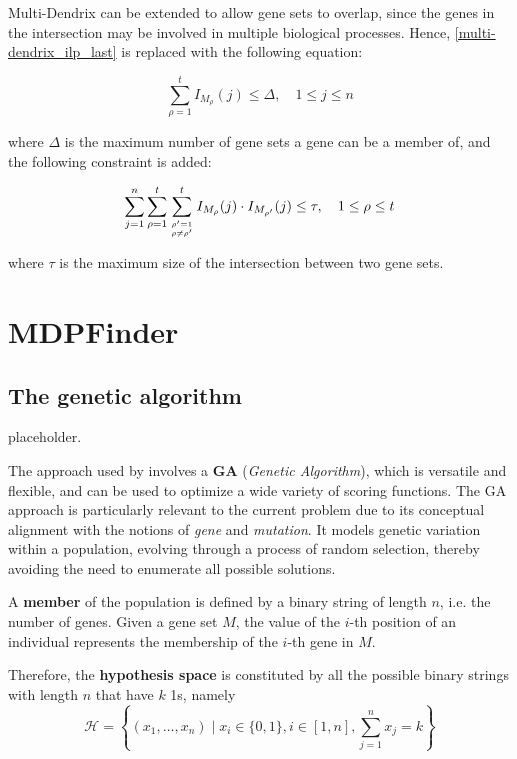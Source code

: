Multi-Dendrix can be extended to allow gene sets to overlap, since the genes in the intersection may be involved in multiple biological processes. Hence, \cref{multi-dendrix_ilp_last} is replaced with the following equation:

\begin{equation}
    \sum_{\rho = 1}^t {I_{M_\rho}(j) \le \Delta}, \quad 1 \le j \le n
\end{equation}

where $\Delta$ is the maximum number of gene sets a gene can be a member of, and the following constraint is added:

\begin{equation}
    \sum_{j = 1}^n {\sum_{\rho = 1}^t \sum_{\rho' = 1 \atop \rho \neq \rho'}^t {{I_{M_\rho} (j) \cdot I_{M_{\rho'}} (j)}}} \le \tau, \quad 1 \le \rho \le t
\end{equation}

where $\tau$ is the maximum size of the intersection between two gene sets.

\section{MDPFinder}

\subsection{The genetic algorithm}

placeholder. 

The approach used by \textcite{mdpfinder} involves a \textbf{GA} (\textit{Genetic Algorithm}), which is versatile and flexible, and can be used to optimize a wide variety of scoring functions. The GA approach is particularly relevant to the current problem due to its conceptual alignment with the notions of \textit{gene} and \textit{mutation}. It models genetic variation within a population, evolving through a process of random selection, thereby avoiding the need to enumerate all possible solutions.

\begin{definition}
    A \textbf{member} of the population is defined by a binary string of length $n$, i.e. the number of genes. Given a gene set $M$, the value of the $i$-th position of an individual represents the membership of the $i$-th gene in $M$.

    Therefore, the \textbf{hypothesis space} is constituted by all the possible binary strings with length $n$ that have $k$ 1s, namely $$\mathcal H = \left\{(x_1, \ldots, x_n) \mid x_i \in \{0, 1\}, i \in [1, n], \sum_{j = 1}^n {x_j} = k \right\}$$
\end{definition}

